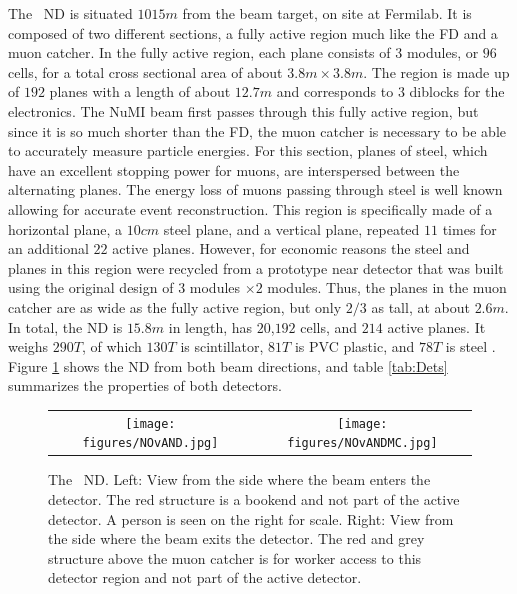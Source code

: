 The \nova~ND is situated $1015\unit{m}$ from the beam target, on site at Fermilab. It is composed of two different sections, a fully active region much like the FD and a muon catcher. In the fully active region, each plane consists of $3$ modules, or $96$ cells, for a total cross sectional area of about $3.8\unit{m} \times 3.8\unit{m}$. The region is made up of $192$ planes with a length of about $12.7\unit{m}$ and corresponds to $3$ diblocks for the electronics. The NuMI beam first passes through this fully active region, but since it is so much shorter than the FD, the muon catcher is necessary to be able to accurately measure particle energies. For this section, planes of steel, which have an excellent stopping power for muons, are interspersed between the alternating planes. The energy loss of muons passing through steel is well known allowing for accurate event reconstruction. This region is specifically made of a horizontal plane, a $10\unit{cm}$ steel plane, and a vertical plane, repeated $11$ times for an additional $22$ active planes. However, for economic reasons the steel and planes in this region were recycled from a prototype near detector that was built using the original design of $3$ modules $\times 2$ modules. Thus, the planes in the muon catcher are as wide as the fully active region, but only $2/3$ as tall, at about $2.6\unit{m}$. In total, the ND is $15.8\unit{m}$ in length, has $20$,$192$ cells, and $214$ active planes. It weighs $290\unit{T}$, of which $130\unit{T}$ is scintillator, $81\unit{T}$ is PVC plastic, and $78\unit{T}$ is steel \cite{ref:NDMass}. Figure \ref{fig:ND} shows the ND from both beam directions, and table \ref{tab:Dets} summarizes the properties of both detectors.
\begin{figure}[htb]
  \centering
  \begin{tabular}{c c}
    \texttt{[image: figures/NOvAND.jpg]} &
    \texttt{[image: figures/NOvANDMC.jpg]} \\
  \end{tabular}
  \caption[The \nova~Near Detector]{The \nova~ND. Left: View from the side where the beam enters the detector. The red structure is a bookend and not part of the active detector. A person is seen on the right for scale. Right: View from the side where the beam exits the detector. The red and grey structure above the muon catcher is for worker access to this detector region and not part of the active detector.}
  \label{fig:ND}
\end{figure}

